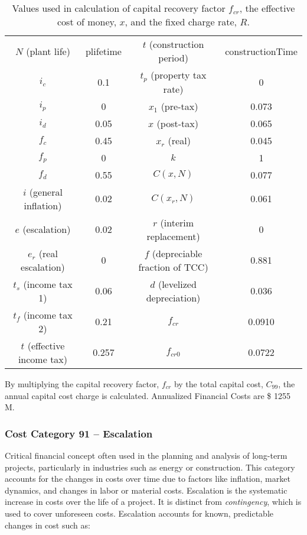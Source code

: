 \begin{table}
    \centering
    \begin{tabular}{cc|cc}
    \hline
      $N$ (plant life)  & plifetime & $t$ (construction period) & constructionTime\\
       $i_c$  & 0.1 & $t_p$ (property tax rate)& 0\\
        $i_p$ & 0 & $x_1$ (pre-tax)& 0.073\\
        $i_d$ & 0.05 & $x$ (post-tax)& 0.065\\
        $f_c$ & 0.45 & $x_r$ (real)& 0.045\\
        $f_p$ & 0 & $k$ & 1\\
        $f_d$ & 0.55 & $C(x,N)$ & 0.077\\
        $i$ (general inflation) & 0.02 & $C(x_r,N)$ & 0.061\\
        $e$  (escalation)& 0.02 & $r$ (interim replacement)& 0\\
        $e_r$ (real escalation) & 0 & $f$ (depreciable fraction of TCC)& 0.881\\
        $t_s$ (income tax 1) & 0.06 & $d$ (levelized depreciation)& 0.036\\
        $t_f$ (income tax 2) & 0.21 & $f_{cr}$ & 0.0910\\
        $t$ (effective income tax) & 0.257 & $f_{cr0}$ & 0.0722\\
    \hline    
    \end{tabular}
    \caption{Values used in calculation of capital recovery factor  $f_{cr}$, the effective cost of money, $x$, and the fixed charge rate, $R$.}
    \label{tab:ec_vals}
    \label{tab:my_label}
\end{table}

By multiplying the capital recovery factor, $f_{cr}$ by the total capital cost, $C_{99}$, the annual capital cost charge is calculated.
Annualized Financial Costs are \$ 1255 M.

\subsubsection*{Cost Category 91 – Escalation}
Critical financial concept often used in the planning and analysis of long-term projects, particularly in industries such as energy or construction. This category accounts for the changes in costs over time due to factors like inflation, market dynamics, and changes in labor or material costs. Escalation is the systematic increase in costs over the life of a project. It is distinct from \textit{contingency}, which is used to cover unforeseen costs. Escalation accounts for known, predictable changes in cost such as:

